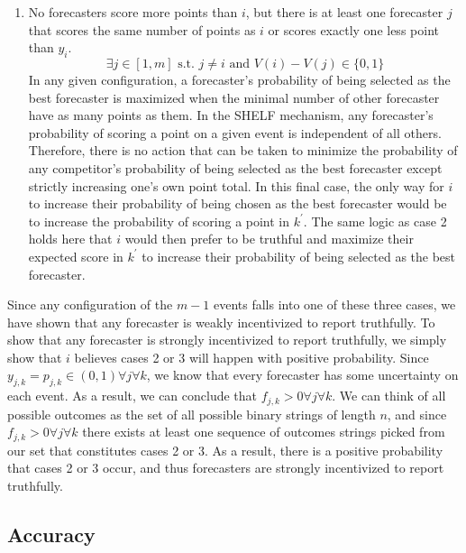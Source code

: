 \documentclass[letterpaper,12pt]{article}
\newcommand{\E}{\mathbb{E}}
\newcommand{\1}{\mathbbm{1}}
\begin{document}
\begin{enumerate}
    \item No forecasters score more points than $i$, but there is at least one forecaster $j$ that scores the same number of points as $i$ or scores exactly one less point than $y_i$.
    $$\exists j \in [1,m] \text{ s.t. } j \ne i \text{ and } V(i) - V(j) \in \{0,1\}$$
    In any given configuration, a forecaster's probability of being selected as the best forecaster is maximized when the minimal number of other forecaster have as many points as them. In the SHELF mechanism, any forecaster's probability of scoring a point on a given event is independent of all others. Therefore, there is no action that can be taken to minimize the probability of any competitor's probability of being selected as the best forecaster except strictly increasing one's own point total. In this final case, the only way for $i$ to increase their probability of being chosen as the best forecaster would be to increase the probability of scoring a point in $k^\prime$. The same logic as case 2 holds here that $i$ would then prefer to be truthful and maximize their expected score in $k^\prime$ to increase their probability of being selected as the best forecaster.
\end{enumerate}

Since any configuration of the $m-1$ events falls into one of these three cases, we have shown that any forecaster is weakly incentivized to report truthfully.
To show that any forecaster is strongly incentivized to report truthfully, we simply show that $i$ believes cases 2 or 3 will happen with positive probability. Since $y_{j,k} = p_{j,k} \in (0,1) \forall j \forall k$, we know that every forecaster has some uncertainty on each event. As a result, we can conclude that $f_{j,k} > 0 \forall j \forall k$. We can think of all possible outcomes as the set of all possible binary strings of length $n$, and since $f_{j,k} > 0 \forall j \forall k$ there exists at least one sequence of outcomes strings picked from our set that constitutes cases 2 or 3. As a result, there is a positive probability that cases 2 or 3 occur, and thus forecasters are strongly incentivized to report truthfully.  

\subsection{Accuracy}

\end{document}
